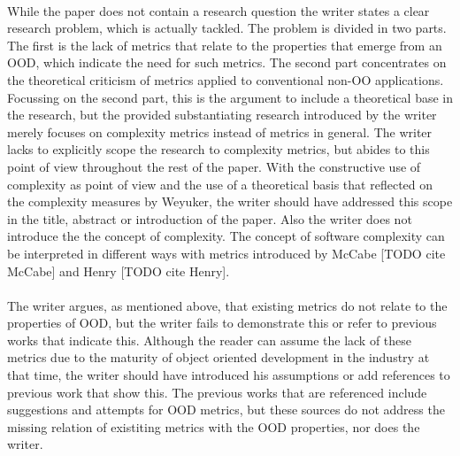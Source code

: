 \paragraph{}
While the paper does not contain a research question the writer states a clear research problem, which is actually tackled.
The problem is divided in two parts. The first is the lack of metrics that relate to the properties that emerge from an
OOD, which indicate the need for such metrics. The second part concentrates on the theoretical criticism of metrics
applied to conventional non-OO applications. Focussing on the second part, this is the argument to include a theoretical base in the
research, but the provided substantiating research introduced by the writer merely focuses on complexity metrics instead
of metrics in general. The writer lacks to explicitly scope the research to complexity metrics, but abides to this
point of view throughout the rest of the paper. With the constructive use of complexity as point of view and the use of
a theoretical basis that reflected on the complexity measures by Weyuker, the writer should have addressed this scope in
the title, abstract or introduction of the paper. Also the writer does not introduce the the concept of complexity. The concept of
software complexity can be interpreted in different ways with metrics introduced by McCabe [TODO cite McCabe]
and Henry [TODO cite Henry].

\paragraph{}
The writer argues, as mentioned above, that existing metrics do not relate to the properties of OOD, but the writer fails
to demonstrate this or refer to previous works that indicate this. Although the reader can assume the lack of these
metrics due to the maturity of object oriented development in the industry at that time, the writer should have introduced
his assumptions or add references to previous work that show this. The previous works that are referenced include suggestions
and attempts for OOD metrics, but these sources do not address the missing relation of existiting metrics with the OOD
properties, nor does the writer.

